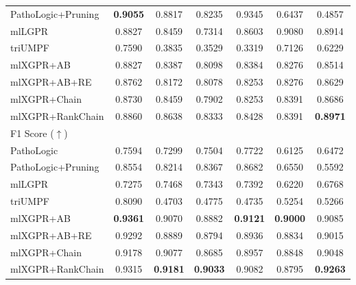 \documentclass[sn-mathphys,Numbered]{sn-jnl}%
\theoremstyle{thmstyleone}%
\theoremstyle{thmstyletwo}%
\theoremstyle{thmstylethree}%
\begin{document}
\begin{table}[ht]
\begin{tabular}{l c c c c c c}
 PathoLogic+Pruning&\textbf{0.9055}&0.8817&0.8235&0.9345&0.6437&0.4857\\
 mlLGPR&0.8827&0.8459&0.7314&0.8603&0.9080&0.8914\\
 triUMPF&0.7590&0.3835&0.3529&0.3319&0.7126&0.6229\\
 mlXGPR+AB&0.8827&0.8387&0.8098&0.8384&0.8276&0.8514\\
 mlXGPR+AB+RE&0.8762&0.8172&0.8078&0.8253&0.8276&0.8629\\
 mlXGPR+Chain&0.8730&0.8459&0.7902&0.8253&0.8391&0.8686\\
 mlXGPR+RankChain&0.8860&0.8638&0.8333&0.8428&0.8391&\textbf{0.8971}\\
 \hline
 \multicolumn{7}{l}{F1 Score ($\uparrow$)}\\
 PathoLogic&0.7594&0.7299&0.7504&0.7722&0.6125&0.6472\\
 PathoLogic+Pruning&0.8554&0.8214&0.8367&0.8682&0.6550&0.5592\\
 mlLGPR&0.7275&0.7468&0.7343&0.7392&0.6220&0.6768\\
 triUMPF&0.8090&0.4703&0.4775&0.4735&0.5254&0.5266\\
mlXGPR+AB&\textbf{0.9361}&0.9070&0.8882&\textbf{0.9121}&\textbf{0.9000}&0.9085\\
mlXGPR+AB+RE&0.9292&0.8889&0.8794&0.8936&0.8834&0.9015\\
mlXGPR+Chain&0.9178&0.9077&0.8685&0.8957&0.8848&0.9048\\
mlXGPR+RankChain&0.9315&\textbf{0.9181}&\textbf{0.9033}&0.9082&0.8795&\textbf{0.9263}\\
 \hline
\end{tabular}
\end{table}
\end{document}
